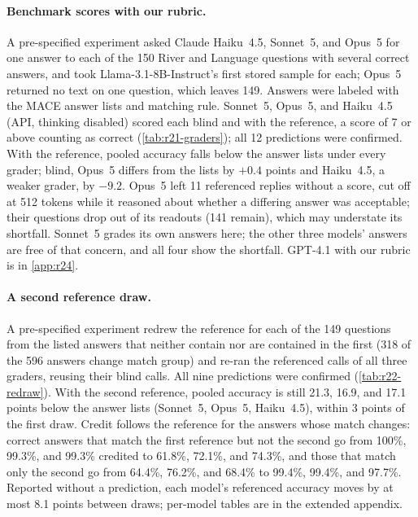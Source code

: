 \paragraph{Benchmark scores with our rubric.}
A pre-specified experiment asked Claude Haiku~4.5, Sonnet~5, and Opus~5 for one answer to each of the 150 River and Language questions with several correct answers, and took Llama-3.1-8B-Instruct's first stored sample for each; Opus~5 returned no text on one question, which leaves 149. Answers were labeled with the \textsc{MACE} answer lists and matching rule. Sonnet~5, Opus~5, and Haiku~4.5 (API, thinking disabled) scored each blind and with the reference, a score of 7 or above counting as correct (\cref{tab:r21-graders}); all 12 predictions were confirmed. With the reference, pooled accuracy falls below the answer lists under every grader; blind, Opus~5 differs from the lists by $+0.4$ points and Haiku~4.5, a weaker grader, by $-9.2$. Opus~5 left 11 referenced replies without a score, cut off at 512 tokens while it reasoned about whether a differing answer was acceptable; their questions drop out of its readouts (141 remain), which may understate its shortfall. Sonnet~5 grades its own answers here; the other three models' answers are free of that concern, and all four show the shortfall. GPT-4.1 with our rubric is in \cref{app:r24}.

\begin{table}[htbp]
\centering
\caption{The benchmark study under three graders: pooled changes against the answer lists (points, 95\% CI) at score thresholds 5, 7, and 10, the max rule at 7, and the shares of correct non-matching answers scored 3 or below, blind and with the reference. For Opus~5 and Haiku~4.5, threshold 7 and the max rule carry registered predictions and thresholds 5 and 10 are registered readouts; Sonnet~5's thresholds 5 and 10 and its max rule are post hoc.}
\label{tab:r21-graders}
\footnotesize

\end{table}

\paragraph{A second reference draw.}
A pre-specified experiment redrew the reference for each of the 149 questions from the listed answers that neither contain nor are contained in the first (318 of the 596 answers change match group) and re-ran the referenced calls of all three graders, reusing their blind calls. All nine predictions were confirmed (\cref{tab:r22-redraw}). With the second reference, pooled accuracy is still 21.3, 16.9, and 17.1 points below the answer lists (Sonnet~5, Opus~5, Haiku~4.5), within 3 points of the first draw. Credit follows the reference for the answers whose match changes: correct answers that match the first reference but not the second go from 100\%, 99.3\%, and 99.3\% credited to 61.8\%, 72.1\%, and 74.3\%, and those that match only the second go from 64.4\%, 76.2\%, and 68.4\% to 99.4\%, 99.4\%, and 97.7\%. Reported without a prediction, each model's referenced accuracy moves by at most 8.1 points between draws; per-model tables are in the extended appendix.

